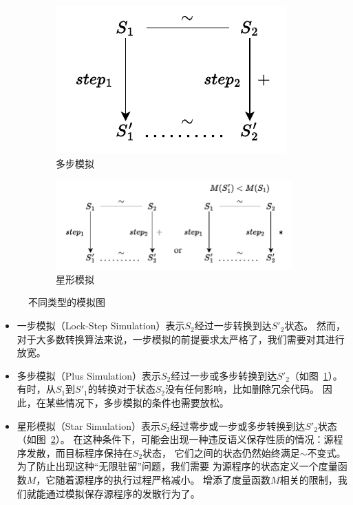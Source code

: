 \begin{figure}[ht]
    \centering
    \begin{subfigure}[b]{0.3\textwidth}
        \includegraphics[width=1\linewidth]{figures/plusstep.pdf}
        \caption{多步模拟}
        \label{fig:plus}
    \end{subfigure}
    \begin{subfigure}[b]{0.6\textwidth}
        \includegraphics[width=1\linewidth]{figures/starstep2.pdf}
        \caption{星形模拟}
        \label{fig:star}
    \end{subfigure}
    \caption{不同类型的模拟图}\label{simustep}
\end{figure}

\begin{itemize}
    \item 一步模拟（Lock-Step Simulation）表示$S_2$经过一步转换到达$S'_2$状态。
        然而，对于大多数转换算法来说，一步模拟的前提要求太严格了，我们需要对其进行放宽。
    \item 多步模拟（Plus Simulation）表示$S_2$经过一步或多步转换到达$S'_2$（如图~\ref{fig:plus}）。
        有时，从$S_1$到$S'_1$的转换对于状态$S_2$没有任何影响，比如删除冗余代码。
        因此，在某些情况下，多步模拟的条件也需要放松。
    \item 星形模拟（Star Simulation）表示$S_2$经过零步或一步或多步转换到达$S'_2$状态（如图~\ref{fig:star}）。
        在这种条件下，可能会出现一种违反语义保存性质的情况：源程序发散，而目标程序保持在$S_2$状态，
        它们之间的状态仍然始终满足$\sim$不变式。为了防止出现这种``无限驻留''问题，我们需要
        为源程序的状态定义一个度量函数$M$，它随着源程序的执行过程严格减小。
        增添了度量函数$M$相关的限制，我们就能通过模拟保存源程序的发散行为了。
\end{itemize}

